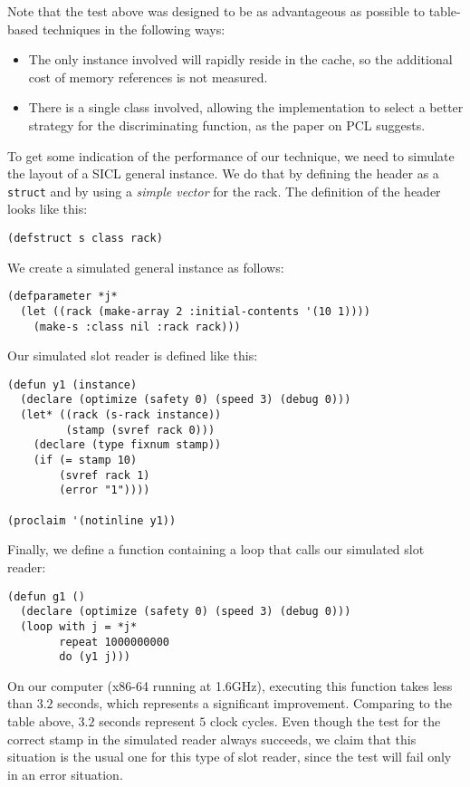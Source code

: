 {Note that the test above was designed to be as advantageous as
possible to table-based techniques in the following ways:

\begin{itemize}
\item The only instance involved will rapidly reside in the cache, so
  the additional cost of memory references is not measured.
\item There is a single class involved, allowing the implementation to
  select a better strategy for the discriminating function, as the
  paper on PCL suggests. 
\end{itemize}

To get some indication of the performance of our technique, we need to
simulate the layout of a SICL general instance.  We do that by
defining the header as a \cl{} \texttt{struct} and by using a
\emph{simple vector} for the rack.  The definition of the header looks
like this:

{\small\begin{verbatim}
(defstruct s class rack)
\end{verbatim}}

We create a simulated general instance as follows:

{\small\begin{verbatim}
(defparameter *j* 
  (let ((rack (make-array 2 :initial-contents '(10 1))))
    (make-s :class nil :rack rack)))
\end{verbatim}}

Our simulated slot reader is defined like this:

{\small\begin{verbatim}
(defun y1 (instance)
  (declare (optimize (safety 0) (speed 3) (debug 0)))
  (let* ((rack (s-rack instance))
         (stamp (svref rack 0)))
    (declare (type fixnum stamp))
    (if (= stamp 10)
        (svref rack 1)
        (error "1"))))

(proclaim '(notinline y1))
\end{verbatim}}

Finally, we define a function containing a loop that calls our
simulated slot reader:

{\small\begin{verbatim}
(defun g1 ()
  (declare (optimize (safety 0) (speed 3) (debug 0)))
  (loop with j = *j*
        repeat 1000000000
        do (y1 j)))
\end{verbatim}}

On our computer (x86-64 running at 1.6GHz), executing this function
takes less than $3.2$ seconds, which represents a significant
improvement.  Comparing to the table above, $3.2$ seconds represent $5$
clock cycles.  Even though the test for the correct stamp in the
simulated reader always succeeds, we claim that this situation is the
usual one for this type of slot reader, since the test will fail only
in an error situation. 

}
